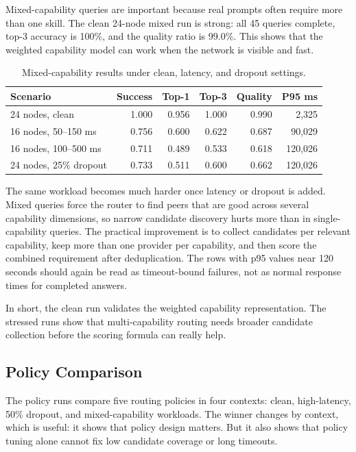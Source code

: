 Mixed-capability queries are important because real prompts often require more
than one skill. The clean 24-node mixed run is strong: all 45 queries complete,
top-3 accuracy is 100\%, and the quality ratio is 99.0\%. This shows that the
weighted capability model can work when the network is visible and fast.

\begin{table}[H]
\centering
\caption{Mixed-capability results under clean, latency, and dropout settings.}
\begin{tabular}{lrrrrr}
\toprule
\textbf{Scenario} & \textbf{Success} & \textbf{Top-1} & \textbf{Top-3} & \textbf{Quality} & \textbf{P95 ms} \\
\midrule
24 nodes, clean & 1.000 & 0.956 & 1.000 & 0.990 & 2,325 \\
16 nodes, 50--150 ms & 0.756 & 0.600 & 0.622 & 0.687 & 90,029 \\
16 nodes, 100--500 ms & 0.711 & 0.489 & 0.533 & 0.618 & 120,026 \\
24 nodes, 25\% dropout & 0.733 & 0.511 & 0.600 & 0.662 & 120,026 \\
\bottomrule
\end{tabular}
\end{table}

The same workload becomes much harder once latency or dropout is added. Mixed
queries force the router to find peers that are good across several capability
dimensions, so narrow candidate discovery hurts more than in single-capability
queries. The practical improvement is to collect candidates per relevant
capability, keep more than one provider per capability, and then score the
combined requirement after deduplication. The rows with p95 values near 120
seconds should again be read as timeout-bound failures, not as normal response
times for completed answers.

In short, the clean run validates the weighted capability representation. The
stressed runs show that multi-capability routing needs broader candidate
collection before the scoring formula can really help.

\subsection{Policy Comparison}

The policy runs compare five routing policies in four contexts: clean,
high-latency, 50\% dropout, and mixed-capability workloads. The winner changes
by context, which is useful: it shows that policy design matters. But it also
shows that policy tuning alone cannot fix low candidate coverage or long
timeouts.

